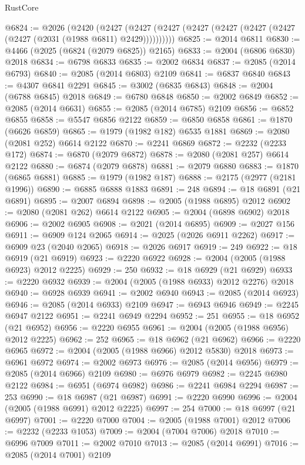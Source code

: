 \begin{lexlean}{RustCore}
\begin{coremodule}
@6824 := @2026
    (@2420
      (@2427 (@2427 (@2427 (@2427 (@2427 (@2427 (@2427 (@2427 (@2031 (@1988 @6811) @2429))))))))))
@6825 := @2014 @6811
@6830 := @4466 (@2025 (@6824 (@2079 @6825)) @2165)
@6833 := @2004 (@6806 @6830) @2018
@6834 := @6798 @6833
@6835 := @2002 @6834
@6837 := @2085 (@2014 @6793)
@6840 := @2085 (@2014 @6803) @2109
@6841 := @6837 @6840
@6843 := @4307 @6841 @2291
@6845 := @3002 (@6835 @6843)
@6848 := @2004 (@6788 @6845) @2018
@6849 := @6780 @6848
@6850 := @2002 @6849
@6852 := @2085 (@2014 @6631)
@6855 := @2085 (@2014 @6785) @2109
@6856 := @6852 @6855
@6858 := @5547 @6856 @2122
@6859 := @6850 @6858
@6861 := @1870 (@6626 @6859)
@6865 := @1979 (@1982 @182) @6535 @1881
@6869 := @2080 (@2081 @252) @6614 @2122
@6870 := @2241 @6869
@6872 := @2232 (@2233 @172)
@6874 := @6870 (@2079 @6872)
@6878 := @2080 (@2081 @257) @6614 @2122
@6880 := @6874 (@2079 @6878)
@6881 := @2079 @6880
@6883 := @1870 (@6865 @6881)
@6885 := @1979 (@1982 @187)
@6888 := @2175 (@2977 (@2181 @1996))
@6890 := @6885 @6888 @1883
@6891 := 248
@6894 := @18 @6891 (@21 @6891)
@6895 := @2007 @6894
@6898 := @2005 (@1988 @6895) @2012
@6902 := @2080 (@2081 @262) @6614 @2122
@6905 := @2004 (@6898 @6902) @2018
@6906 := @2002 @6905
@6908 := @2021 (@2014 @6895)
@6909 := @2027 @156
@6911 := @6909 @124 @2065
@6914 := @2025 (@2026 @6911 @2262)
@6917 := @6909 @23 (@2040 @2065)
@6918 := @2026 @6917
@6919 := 249
@6922 := @18 @6919 (@21 @6919)
@6923 := @2220 @6922
@6928 := @2004 (@2005 (@1988 @6923) @2012 @2225)
@6929 := 250
@6932 := @18 @6929 (@21 @6929)
@6933 := @2220 @6932
@6939 := @2004 (@2005 (@1988 @6933) @2012 @2276) @2018
@6940 := @6928 @6939
@6941 := @2002 @6940
@6943 := @2085 (@2014 @6923)
@6946 := @2085 (@2014 @6933) @2109
@6947 := @6943 @6946
@6949 := @2245 @6947 @2122
@6951 := @2241 @6949 @2294
@6952 := 251
@6955 := @18 @6952 (@21 @6952)
@6956 := @2220 @6955
@6961 := @2004 (@2005 (@1988 @6956) @2012 @2225)
@6962 := 252
@6965 := @18 @6962 (@21 @6962)
@6966 := @2220 @6965
@6972 := @2004 (@2005 (@1988 @6966) @2012 @5830) @2018
@6973 := @6961 @6972
@6974 := @2002 @6973
@6976 := @2085 (@2014 @6956)
@6979 := @2085 (@2014 @6966) @2109
@6980 := @6976 @6979
@6982 := @2245 @6980 @2122
@6984 := @6951 (@6974 @6982)
@6986 := @2241 @6984 @2294
@6987 := 253
@6990 := @18 @6987 (@21 @6987)
@6991 := @2220 @6990
@6996 := @2004 (@2005 (@1988 @6991) @2012 @2225)
@6997 := 254
@7000 := @18 @6997 (@21 @6997)
@7001 := @2220 @7000
@7004 := @2005 (@1988 @7001) @2012
@7006 := @2232 (@2233 @1053)
@7009 := @2004 (@7004 @7006) @2018
@7010 := @6996 @7009
@7011 := @2002 @7010
@7013 := @2085 (@2014 @6991)
@7016 := @2085 (@2014 @7001) @2109

\end{coremodule}
\end{lexlean}
